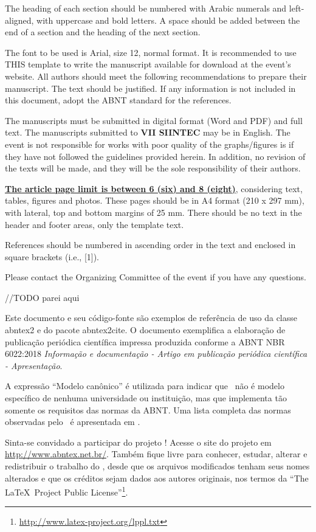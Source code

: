 \documentclass[
	article,			%
	12pt,				%
	oneside,			%
	a4paper,			%
	english,			%
	brazil,				%
	sumario=tradicional
	]{abntex2}
\begin{document}
The heading of each section should be numbered with Arabic numerals and left-aligned, with uppercase and bold letters. A space should be added between the end of a section and the heading of the next section.

The font to be used is Arial, size 12, normal format. It is recommended to use THIS template to write the manuscript available for download at the event's website. All authors should meet the following recommendations to prepare their manuscript. The text should be justified. If any information is not included in this document, adopt the ABNT standard for the references.

The manuscripts must be submitted in digital format (Word and PDF) and full text. The manuscripts submitted to \textbf{VII SIINTEC} may be in English. The event is not responsible for works with poor quality of the graphs/figures is if they have not followed the guidelines provided herein. In addition, no revision of the texts will be made, and they will be the sole responsibility of their authors.

\textbf{\underline{The article page limit is between 6 (six) and 8 (eight)}}, considering text, tables, figures and photos. These pages should be in A4 format (210 x 297 mm), with lateral, top and bottom margins of 25 mm. There should be no text in the header and footer areas, only the template text.

References should be numbered in ascending order in the text and enclosed in square brackets (i.e., [1]).

Please contact the Organizing Committee of the event if you have any questions.


//TODO parei aqui


Este documento e seu código-fonte são exemplos de referência de uso da classe
\textsf{abntex2} e do pacote \textsf{abntex2cite}. O documento exemplifica a
elaboração de publicação periódica científica impressa produzida conforme a ABNT
NBR 6022:2018 \emph{Informação e documentação - Artigo em publicação periódica
científica - Apresentação}.

A expressão ``Modelo canônico'' é utilizada para indicar que \abnTeX\ não é
modelo específico de nenhuma universidade ou instituição, mas que implementa tão
somente os requisitos das normas da ABNT. Uma lista completa das normas
observadas pelo \abnTeX\ é apresentada em .

Sinta-se convidado a participar do projeto \abnTeX! Acesse o site do projeto em
\url{http://www.abntex.net.br/}. Também fique livre para conhecer,
estudar, alterar e redistribuir o trabalho do \abnTeX, desde que os arquivos
modificados tenham seus nomes alterados e que os créditos sejam dados aos
autores originais, nos termos da ``The \LaTeX\ Project Public
License''\footnote{\url{http://www.latex-project.org/lppl.txt}}.
\end{document}
